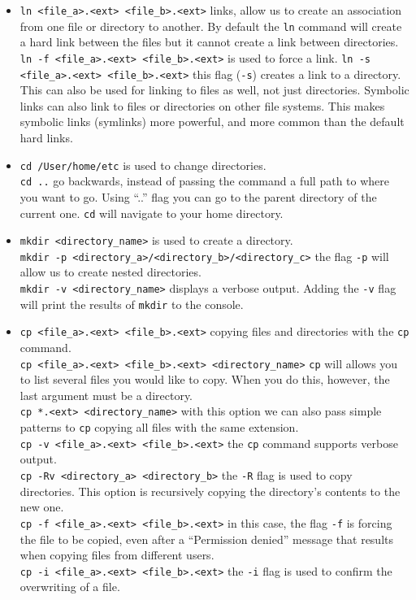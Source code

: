 \documentclass{article}
\begin{document}
\begin{itemize}
    	\item {\tt ln <file\_a>.<ext> <file\_b>.<ext>} links, allow us to create an association from one file or directory to another. By default the {\tt ln} command will create a hard link between the files but it cannot create a link between directories.\\
    	{\tt ln -f <file\_a>.<ext> <file\_b>.<ext>} is used to force a link.
    	{\tt ln -s <file\_a>.<ext> <file\_b>.<ext>} this flag ({\tt -s}) creates a link to a directory. This can also be used for linking to files as well, not just directories. Symbolic links can also link to files or directories on other file systems. This makes symbolic links (symlinks) more powerful, and more common than the default hard links.
    	
    	\item {\tt cd /User/home/etc} is used to change directories.\\
    	{\tt cd ..} go backwards, instead of passing the command a full path to where you want to go. Using ``..'' flag you can go to the parent directory of the current one.
    	{\tt cd} will navigate to your home directory.
    	
    	\item {\tt mkdir <directory\_name>} is used to create a directory.\\
    	{\tt mkdir -p <directory\_a>/<directory\_b>/<directory\_c>} the flag {\tt -p} will allow us to create nested directories.\\
    	{\tt mkdir -v <directory\_name>} displays a verbose output. Adding the {\tt -v} flag will print the results of {\tt mkdir} to the console.
    	
    	\item {\tt cp <file\_a>.<ext> <file\_b>.<ext>} copying files and directories with the {\tt cp} command.\\
    	{\tt cp <file\_a>.<ext> <file\_b>.<ext> <directory\_name>} {\tt cp} will allows you to list several files you would like to copy. When you do this, however, the last argument must be a directory.\\
    	{\tt cp *.<ext> <directory\_name>} with this option we can also pass simple patterns to {\tt cp} copying all files with the same extension.\\
    	{\tt cp -v <file\_a>.<ext> <file\_b>.<ext>} the {\tt cp} command supports verbose output.\\
    	{\tt cp -Rv <directory\_a> <directory\_b>} the {\tt -R} flag is used to copy directories. This option is recursively copying the directory's contents to the new one.\\
    	{\tt cp -f <file\_a>.<ext> <file\_b>.<ext>} in this case, the flag {\tt -f} is forcing the file to be copied, even after a ``Permission denied'' message that results when copying files from different users.\\
    	{\tt cp -i <file\_a>.<ext> <file\_b>.<ext>} the {\tt -i} flag is used to confirm the overwriting of a file.
    	

\end{itemize}
\end{document}
